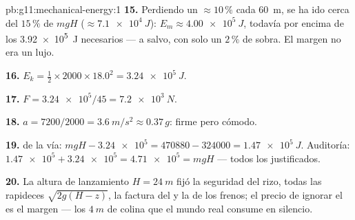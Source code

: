 \begin{solution}{pb:g11:mechanical-energy:1}
\textbf{15.} Perdiendo un $\approx 10\,\%$ cada \qty{60}{m}, se ha ido
cerca del $15\,\%$ de $mgH$ ($\approx \qty{7.1e4}{J}$):
$E_m \approx \qty{4.00e5}{J}$, todavía por encima de los
\qty{3.92e5}{J} necesarios --- a salvo, con solo un $2\,\%$ de sobra. El
margen no era un lujo.

\textbf{16.} $E_k = \tfrac12 \times 2000 \times 18.0^2 =
\qty{3.24e5}{J}$.

\textbf{17.} $F = \num{3.24e5}/45 = \qty{7.2e3}{N}$.

\textbf{18.} $a = 7200/2000 = \qty{3.6}{m/s^2} \approx 0.37\,g$: firme
pero cómodo.

\textbf{19.}  de la vía:
$mgH - \num{3.24e5} = \num{470880} - \num{324000} = \qty{1.47e5}{J}$.
Auditoría: $\num{1.47e5} + \num{3.24e5} = \num{4.71e5} = mgH$ --- todos
los  justificados.

\textbf{20.} La altura de lanzamiento $H = \qty{24}{m}$ fijó la
seguridad del rizo, todas las rapideces $\sqrt{2g(H - z)}$, la factura
del  y la  de los frenos; el precio de ignorar el
 es el margen --- los $\qty{4}{m}$ de colina que el mundo real
consume en silencio.
\end{solution}
